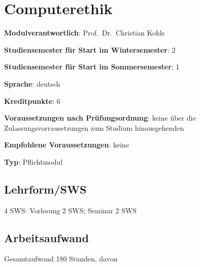 \chapter{Computerethik\label{/mi-2017/modulbeschreibungen-master/MA_All_Computerethik}}\label{computerethikpathlabelmi-2017modulbeschreibungen-mastermaux5fallux5fcomputerethik}

\begin{modulHead}
\textbf{Modulverantwortlich}: Prof.~Dr.~Christian
Kohls
\end{modulHead}
\begin{modulHead}
\textbf{Studiensemester für
Start im Wintersemester}:
2
\end{modulHead}
\begin{modulHead}
\textbf{Studiensemester für Start
im Sommersemester}:
1
\end{modulHead}
\begin{modulHead}
\textbf{Sprache}:
deutsch
\end{modulHead}
\begin{modulHead}
\textbf{Kreditpunkte}:
6
\end{modulHead}
\begin{modulHead}
\textbf{Voraussetzungen nach
Prüfungsordnung}: keine über die Zulassungsvorrausetzungen zum Studium
hinausgehenden
\end{modulHead}
\begin{modulHead}
\textbf{Empfohlene
Voraussetzungen}: keine
\end{modulHead}
\begin{modulHead}
\textbf{Typ}:
Pflichtmodul
\end{modulHead}


\section*{Lehrform/SWS\label{/mi-2017/modulbeschreibungen-master/MA_All_Computerethik}}\label{lehrformswspathlabelmi-2017modulbeschreibungen-mastermaux5fallux5fcomputerethik}

4 SWS: Vorlesung 2 SWS; Seminar 2 SWS

\section*{Arbeitsaufwand\label{/mi-2017/modulbeschreibungen-master/MA_All_Computerethik}}\label{arbeitsaufwandpathlabelmi-2017modulbeschreibungen-mastermaux5fallux5fcomputerethik}

Gesamtaufwand 180 Stunden, davon


